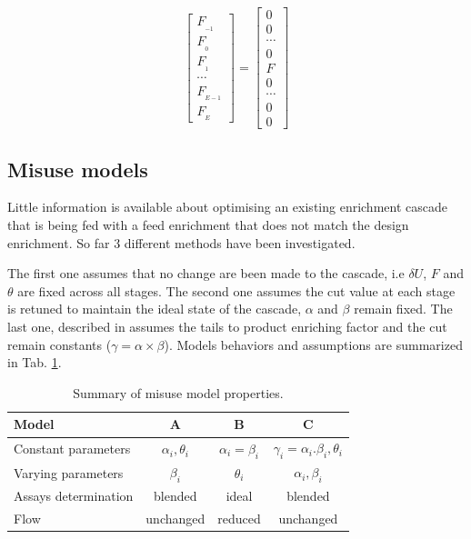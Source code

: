\begin{equation}
\begin{bmatrix}
     F_{_{-1}}  \\
     F_{_{0} }  \\
     F_{_{1} }  \\
     \cdots     \\
     F_{_{E-1}} \\
     F_{_{E}}
 \end{bmatrix}
 =
 \begin{bmatrix}
     0      \\
     0      \\
     \cdots \\
     0      \\
     F      \\
     0      \\
     \cdots \\
     0      \\
     0
\end{bmatrix}
\label{eq_flow}
\end{equation}



\subsection{Misuse models}

Little information is available about optimising an existing enrichment cascade
that is being fed with a feed enrichment that does not match the design
enrichment. So far 3 different methods have been investigated.

The first one assumes that no change are been made to the cascade, i.e $\delta
U$, $F$ and $\theta$ are fixed across all stages. The second one assumes the cut
value at each stage is retuned to maintain the ideal state of the cascade,
$\alpha$ and $\beta$ remain fixed. The last one, described in \cite{walker.2017}
assumes the tails to product enriching factor and the cut remain constants ($\gamma =
\alpha\times\beta$). Models behaviors and assumptions are summarized in Tab.
\ref{tab:models}.

\begin{table}[htb]
\centering
  \caption{Summary of misuse model properties.}
\begin{tabular}{l|ccc}
\toprule

Model                &    A                 & B                  & C  \\
\midrule
Constant parameters  & $\alpha_i, \theta_i$ & $\alpha_i=\beta_i$ & $\gamma_i=\alpha_i .\beta_i, \theta_i$       \\
Varying parameters   & $\beta_i$            & $\theta_i$         & $\alpha_i, \beta_i$                     \\
Assays determination & blended              & ideal              & blended                  \\
Flow                 & unchanged            & reduced            & unchanged       \\

\bottomrule
\end{tabular}
  \label{tab:models}
\end{table}

